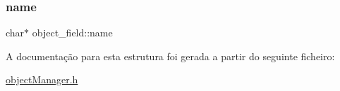 \mbox{\label{structobject__field_ac75a676a209e55c6cd75433a64b3e2fd}} 
\subsubsection{\texorpdfstring{name}{name}}
{\footnotesize\ttfamily char$\ast$ object\+\_\+field\+::name}



A documentação para esta estrutura foi gerada a partir do seguinte ficheiro\+:\begin{DoxyCompactItemize}
\item 
\hyperlink{object_manager_8h}{object\+Manager.\+h}\end{DoxyCompactItemize}
